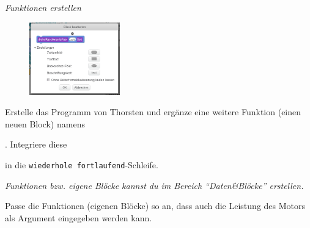 \begin{aufgabe}\emph{Funktionen erstellen}
	
	\begin{figure}
		\centering
		\vspace{-\baselineskip}
		\includegraphics[width=0.35\textwidth]{./pics/neuer-block.png}
	\end{figure}
	Erstelle das Programm von Thorsten und ergänze eine weitere Funktion (einen neuen Block) namens 
	
	. Integriere diese 
	
	in die \texttt{wiederhole fortlaufend}-Schleife.
	
	\emph{Funktionen bzw. eigene Blöcke kannst du im Bereich \enquote{Daten\&Blöcke} erstellen.}
	
	Passe die Funktionen (eigenen Blöcke) so an, dass auch die Leistung des Motors als Argument eingegeben werden kann.
\end{aufgabe}

